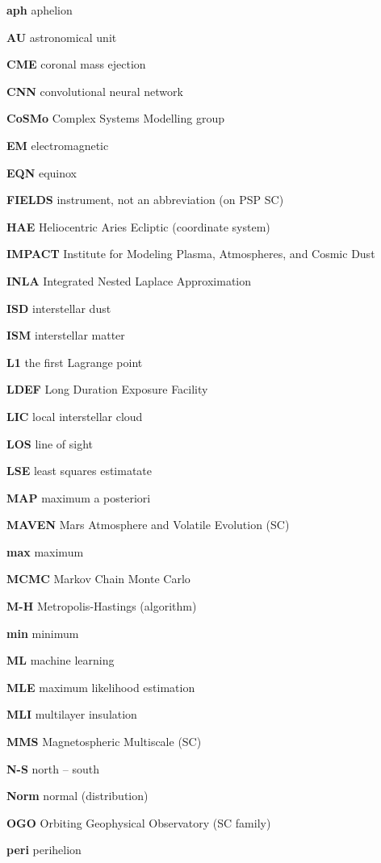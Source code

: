 \noindent

\textbf{aph} aphelion

\textbf{AU} astronomical unit

\textbf{CME} coronal mass ejection

\textbf{CNN} convolutional neural network

\textbf{CoSMo} Complex Systems Modelling group

\textbf{EM} electromagnetic

\textbf{EQN} equinox

\textbf{FIELDS} instrument, not an abbreviation (on PSP SC)

\textbf{HAE} Heliocentric Aries Ecliptic (coordinate system)

\textbf{IMPACT} Institute for Modeling Plasma, Atmospheres, and Cosmic Dust

\textbf{INLA} Integrated Nested Laplace Approximation

\textbf{ISD} interstellar dust

\textbf{ISM} interstellar matter

\textbf{L1} the first Lagrange point

\textbf{LDEF} Long Duration Exposure Facility

\textbf{LIC} local interstellar cloud

\textbf{LOS} line of sight

\textbf{LSE} least squares estimatate

\textbf{MAP} maximum a posteriori

\textbf{MAVEN}  Mars Atmosphere and Volatile Evolution (SC)

\textbf{max} maximum

\textbf{MCMC} Markov Chain Monte Carlo

\textbf{M-H} Metropolis-Hastings (algorithm)

\textbf{min} minimum

\textbf{ML} machine learning

\textbf{MLE} maximum likelihood estimation

\textbf{MLI} multilayer insulation

\textbf{MMS} Magnetospheric Multiscale (SC)

\textbf{N-S} north -- south

\textbf{Norm} normal (distribution) 

\textbf{OGO} Orbiting Geophysical Observatory (SC family)

\textbf{peri} perihelion

